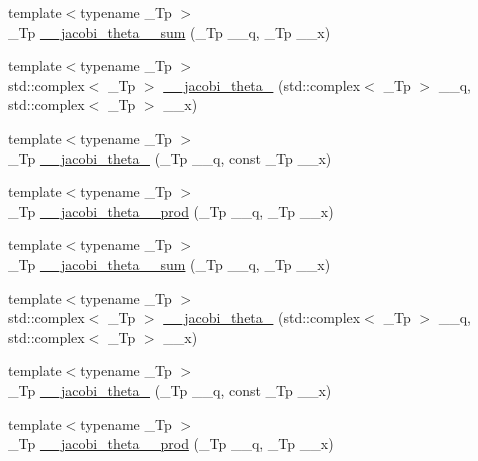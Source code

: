 \begin{DoxyCompactItemize}
\item 
{\footnotesize template$<$typename \+\_\+\+Tp $>$ }\\\+\_\+\+Tp \hyperlink{namespacestd_1_1____detail_adea964551a6650baebe13574d942bf50}{\+\_\+\+\_\+jacobi\+\_\+theta\+\_\+\_\+sum} (\+\_\+\+Tp \+\_\+\+\_\+q, \+\_\+\+Tp \+\_\+\+\_\+x)
\item 
{\footnotesize template$<$typename \+\_\+\+Tp $>$ }\\std\+::complex$<$ \+\_\+\+Tp $>$ \hyperlink{namespacestd_1_1____detail_aba908b579191a0c5f55be7db84ece5c5}{\+\_\+\+\_\+jacobi\+\_\+theta\+\_} (std\+::complex$<$ \+\_\+\+Tp $>$ \+\_\+\+\_\+q, std\+::complex$<$ \+\_\+\+Tp $>$ \+\_\+\+\_\+x)
\item 
{\footnotesize template$<$typename \+\_\+\+Tp $>$ }\\\+\_\+\+Tp \hyperlink{namespacestd_1_1____detail_a5aace3bea7c88443d5bceb503a0452d0}{\+\_\+\+\_\+jacobi\+\_\+theta\+\_} (\+\_\+\+Tp \+\_\+\+\_\+q, const \+\_\+\+Tp \+\_\+\+\_\+x)
\item 
{\footnotesize template$<$typename \+\_\+\+Tp $>$ }\\\+\_\+\+Tp \hyperlink{namespacestd_1_1____detail_acc790f257c25f021704f9c9e1ad9df29}{\+\_\+\+\_\+jacobi\+\_\+theta\+\_\+\_\+prod} (\+\_\+\+Tp \+\_\+\+\_\+q, \+\_\+\+Tp \+\_\+\+\_\+x)
\item 
{\footnotesize template$<$typename \+\_\+\+Tp $>$ }\\\+\_\+\+Tp \hyperlink{namespacestd_1_1____detail_a6eba88f5f854974b7fe7445e9b11a0e0}{\+\_\+\+\_\+jacobi\+\_\+theta\+\_\+\_\+sum} (\+\_\+\+Tp \+\_\+\+\_\+q, \+\_\+\+Tp \+\_\+\+\_\+x)
\item 
{\footnotesize template$<$typename \+\_\+\+Tp $>$ }\\std\+::complex$<$ \+\_\+\+Tp $>$ \hyperlink{namespacestd_1_1____detail_ac7a6c396a102438d2c104f344b4f6a72}{\+\_\+\+\_\+jacobi\+\_\+theta\+\_} (std\+::complex$<$ \+\_\+\+Tp $>$ \+\_\+\+\_\+q, std\+::complex$<$ \+\_\+\+Tp $>$ \+\_\+\+\_\+x)
\item 
{\footnotesize template$<$typename \+\_\+\+Tp $>$ }\\\+\_\+\+Tp \hyperlink{namespacestd_1_1____detail_a6a7102085368188062ef47100ce80239}{\+\_\+\+\_\+jacobi\+\_\+theta\+\_} (\+\_\+\+Tp \+\_\+\+\_\+q, const \+\_\+\+Tp \+\_\+\+\_\+x)
\item 
{\footnotesize template$<$typename \+\_\+\+Tp $>$ }\\\+\_\+\+Tp \hyperlink{namespacestd_1_1____detail_aef15a9b55f5f4ed8b1f6d6113ad0ef12}{\+\_\+\+\_\+jacobi\+\_\+theta\+\_\+\_\+prod} (\+\_\+\+Tp \+\_\+\+\_\+q, \+\_\+\+Tp \+\_\+\+\_\+x)

\end{DoxyCompactItemize}
